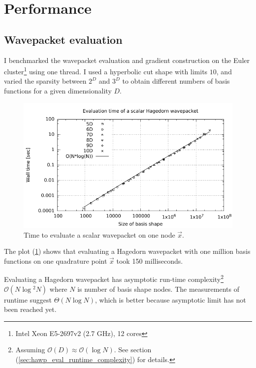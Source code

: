 \documentclass{article}
\begin{document}
\section{Performance}

\subsection{Wavepacket evaluation}

I benchmarked the wavepacket evaluation and gradient construction
on the
Euler cluster\footnote{Intel Xeon E5-2697v2 (2.7 GHz), 12 cores}
using one thread.
I used a hyperbolic cut shape with limits \(10\), and varied the
sparsity between \(2^D\) and \(3^D\) to obtain different numbers of
basis functions for a given dimensionality \(D\).

\begin{figure}[H]
  \centering
  \includegraphics[width=1.0\textwidth]{plots/hawp_eval_runtime}
  \caption{Time to evaluate a scalar wavepacket on one node \(\vec{x}\).}
  \label{fig:hawp_eval_runtime}
\end{figure}

The plot (\ref{fig:hawp_eval_runtime}) shows that
evaluating a Hagedorn wavepacket with one million basis functions
on one quadrature point \(\vec{x}\) took 150 milliseconds.

Evaluating a Hagedorn wavepacket has asymptotic run-time
complexity\footnote{Assuming \(\mathcal{O}(D) \approx \mathcal{O}(\log{}N)\).
See section (\ref{sec:hawp_eval_runtime_complexity}) for details.}
\(\mathcal{O}(N \log{}^2N)\)
where \(N\) is number of basis shape nodes. The measurements of runtime suggest \(\Theta(N\log{}N)\),
which is better because asymptotic limit has not been reached yet.
\end{document}
